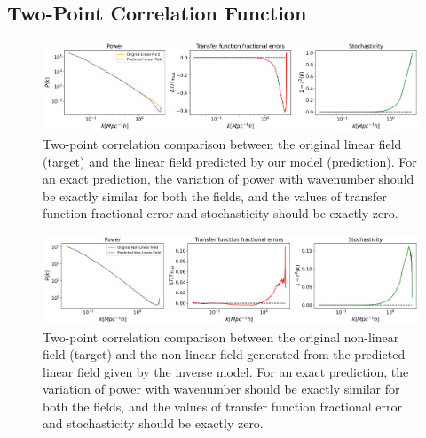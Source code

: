 \documentclass[11pt]{article}
\begin{document}
\subsection{Two-Point Correlation Function}

\begin{figure}[t!]
  \begin{center}
  \centerline{\includegraphics[width=\textwidth]{images/lin.png}}
  \caption{Two-point correlation comparison between the original linear field (target) and the linear field predicted by our model (prediction). For an exact prediction, the variation of power with wavenumber should be exactly similar for both the fields, and the values of transfer function fractional error and stochasticity should be exactly zero. }
  \label{lin}
  \end{center}
\end{figure}

\begin{figure}[t!]
  \begin{center}
  \centerline{\includegraphics[width=\textwidth]{images/dis.png}}
  \caption{Two-point correlation comparison between the original non-linear field (target) and the non-linear field generated from the predicted linear field given by the inverse model. For an exact prediction, the variation of power with wavenumber should be exactly similar for both the fields, and the values of transfer function fractional error and stochasticity should be exactly zero.}
  \label{dis}
  \end{center}
\end{figure}
\end{document}
